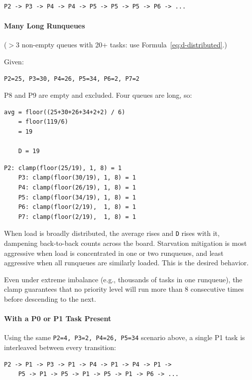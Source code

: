\documentclass[11pt]{article}
\begin{document}
\begin{Verbatim}[fontsize=\small]
	P2 -> P3 -> P4 -> P4 -> P5 -> P5 -> P5 -> P6 -> ...
\end{Verbatim}

\paragraph{Many Long Runqueues}

(\(>\)3 non-empty queues with 20+ tasks: use Formula~\ref{eq:d-distributed}.)

Given:

\begin{Verbatim}[fontsize=\small]
	P2=25, P3=30, P4=26, P5=34, P6=2, P7=2
\end{Verbatim}

P8 and P9 are empty and excluded. Four queues are long, so:

\begin{Verbatim}[fontsize=\small]
	avg = floor((25+30+26+34+2+2) / 6)
	= floor(119/6)
	= 19

	D = 19
\end{Verbatim}

\begin{Verbatim}[fontsize=\small]
	P2: clamp(floor(25/19), 1, 8) = 1
	P3: clamp(floor(30/19), 1, 8) = 1
	P4: clamp(floor(26/19), 1, 8) = 1
	P5: clamp(floor(34/19), 1, 8) = 1
	P6: clamp(floor(2/19),  1, 8) = 1
	P7: clamp(floor(2/19),  1, 8) = 1
\end{Verbatim}

When load is broadly distributed, the average rises and \texttt{D} rises with it, dampening back-to-back counts across the board.
Starvation mitigation is most aggressive when load is concentrated in one or two runqueues, and least aggressive when all runqueues are similarly loaded.
This is the desired behavior.

Even under extreme imbalance (e.g., thousands of tasks in one runqueue), the clamp guarantees that no priority level will run more than 8 consecutive times before descending to the next.

\paragraph{With a P0 or P1 Task Present}

Using the same \texttt{P2=4, P3=2, P4=26, P5=34} scenario above, a single P1 task is interleaved between every transition:

\begin{Verbatim}[fontsize=\small]
	P2 -> P1 -> P3 -> P1 -> P4 -> P1 -> P4 -> P1 ->
	P5 -> P1 -> P5 -> P1 -> P5 -> P1 -> P6 -> ...
\end{Verbatim}
\end{document}
